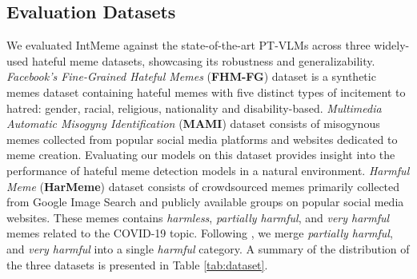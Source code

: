 \subsection{Evaluation Datasets} 
We evaluated \textsf{IntMeme} against the state-of-the-art PT-VLMs across three widely-used hateful meme datasets, showcasing its robustness and generalizability. 
\textit{Facebook’s Fine-Grained Hateful Memes} (\textbf{FHM-FG}) dataset \cite{mathias2021fhmfg} is a synthetic memes dataset containing hateful memes with five distinct types of incitement to hatred: gender, racial, religious, nationality and disability-based. \textit{Multimedia Automatic Misogyny Identification} (\textbf{MAMI}) dataset \cite{fersini2022mami} consists of misogynous memes collected from popular social media platforms and websites dedicated to meme creation. Evaluating our models on this dataset provides insight into the performance of hateful meme detection models in a natural environment. \textit{Harmful Meme} (\textbf{HarMeme}) dataset \cite{pramanick2021harmemes} consists of crowdsourced memes primarily collected from Google Image Search and publicly available groups on popular social media websites. These memes contains \textit{harmless}, \textit{partially harmful}, and \textit{very harmful} memes related to the COVID-19 topic. Following \citeauthor{pramanick2021harmemes}, we merge \textit{partially harmful}, and \textit{very harmful} into a single \textit{harmful} category.
A summary of the distribution of the three datasets is presented in Table \ref{tab:dataset}.

